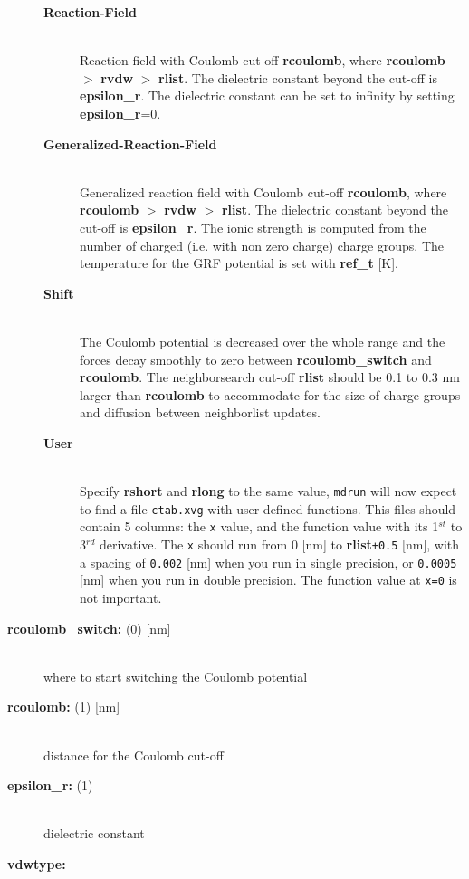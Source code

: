 \begin{description}
\begin{description}
\item[{\bf Reaction-Field}]\mbox{}\\
Reaction field with Coulomb cut-off {\bf rcoulomb},
where {\bf rcoulomb} {\tt $>$} {\bf rvdw} {\tt $>$} {\bf rlist}.
The dielectric constant beyond the cut-off is {\bf epsilon\_r}.
The dielectric constant can be set to infinity by setting {\bf epsilon\_r}=0.
\item[{\bf Generalized-Reaction-Field}]\mbox{}\\
Generalized reaction field with Coulomb cut-off {\bf rcoulomb},
where {\bf rcoulomb} {\tt $>$} {\bf rvdw} {\tt $>$} {\bf rlist}.
The dielectric constant beyond the cut-off is {\bf epsilon\_r}.
The ionic strength is computed from the number of charged 
(i.e. with non zero charge) charge groups.
The temperature for the GRF potential is set with 
{\bf ref\_t} [K].
\item[{\bf Shift}]\mbox{}\\
The Coulomb
potential is decreased over the whole range and the forces decay smoothly
to zero between {\bf rcoulomb\_switch} and {\bf rcoulomb}.
The neighborsearch cut-off {\bf rlist} should be 0.1 to 0.3 nm larger than
{\bf rcoulomb} to accommodate for the size of charge groups and diffusion
between neighborlist updates.
\item[{\bf User}]\mbox{}\\
Specify {\bf rshort} and {\bf rlong} to the same value, {\tt mdrun}
will now expect to find a file {\tt ctab.xvg} with user-defined functions.
This files should contain 5 columns:
the {\tt x} value, and the function value with its 1$^{st}$
to 3$^{rd}$ derivative. The {\tt x} should run from 0 [nm] to
{\bf rlist}{\tt +0.5} [nm], with a spacing of {\tt 0.002}
[nm] when you run in single precision, or {\tt 0.0005} [nm] when
you run in double precision. The function value at {\tt x=0} is not
important.
\end{description}
\item[{\bf rcoulomb\_switch: }(0) {[nm]}]\mbox{}\\
where to start switching the Coulomb potential
\item[{\bf rcoulomb: }(1) {[nm]}]\mbox{}\\
distance for the Coulomb cut-off
\item[{\bf epsilon\_r: }(1)]\mbox{}\\
dielectric constant
\item[{\bf vdwtype:}]\mbox{}\\
\vspace{-2ex}\begin{description}

\end{description}
\end{description}
